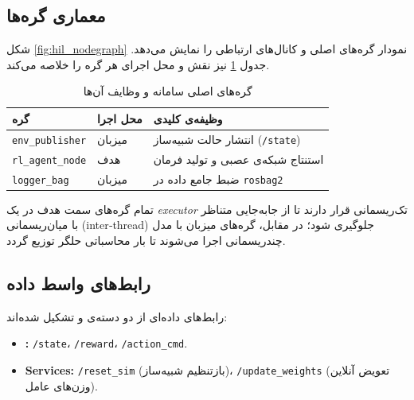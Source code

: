 	\subsection{معماری گره‌ها}\label{subsec:ros2_nodes}
	شکل \ref{fig:hil_nodegraph} نمودار گره‌های اصلی و کانال‌های ارتباطی را نمایش می‌دهد. جدول \ref{tab:ros2_nodes} نیز نقش و محل اجرای هر گره را خلاصه می‌کند.
	
	\begin{table}[ht]
		\centering
		\caption{گره‌های اصلی سامانه و وظایف آن‌ها}\label{tab:ros2_nodes}
		\begin{tabular}{@{}lll@{}}
			\toprule
			\textbf{گره}             & \textbf{محل اجرا} & \textbf{وظیفه‌ی کلیدی} \\ \midrule
			\texttt{env\_publisher}  & میزبان           & انتشار حالت شبیه‌ساز (\texttt{/state})        \\
			\texttt{rl\_agent\_node} & هدف              & استنتاج شبکه‌ی عصبی و تولید فرمان              \\
			\texttt{logger\_bag}     & میزبان           & ضبط جامع داده در \texttt{rosbag2}              \\ \bottomrule
		\end{tabular}
	\end{table}
	
	تمام گره‌های سمت هدف در یک \textit{executor} تک‌ریسمانی قرار دارند تا از جابه‌جایی متناظر با میان‌ریسمانی (inter‑thread) جلوگیری شود؛ در مقابل، گره‌های میزبان با مدل چندریسمانی اجرا می‌شوند تا بار محاسباتی حلگر توزیع گردد.
	
	\subsection{رابط‌های واسط داده}\label{subsec:ros2_interfaces}
	رابط‌های داده‌ای از دو دسته‌ی  و  تشکیل شده‌اند:
	
	\begin{itemize}
		\item \textbf{:}
		\texttt{/state}، \texttt{/reward}، \texttt{/action\_cmd}.
		\item \textbf{Services:}
		\texttt{/reset\_sim} (بازتنظیم شبیه‌ساز)، \texttt{/update\_weights} (تعویض آنلاین وزن‌های عامل).
	\end{itemize}
	
